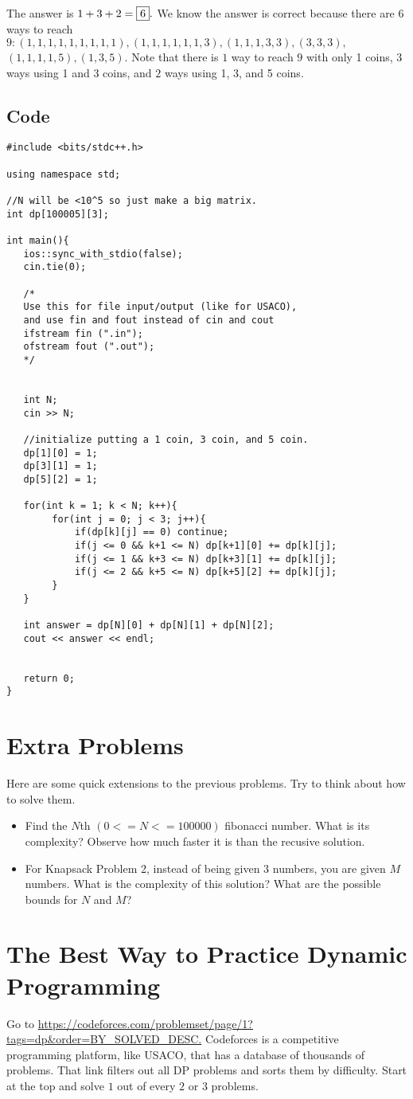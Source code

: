 \documentclass{article}
\begin{document}
The answer is $1+3+2=\fbox{6}.$ We know the answer is correct because there are $6$ ways to reach $9: (1,1,1,1,1,1,1,1,1), (1,1,1,1,1,1,3), (1,1,1,3,3), (3,3,3),$ $(1,1,1,1,5), (1,3,5).$ Note that there is $1$ way to reach $9$ with only 1 coins, $3$ ways using 1 and 3 coins, and $2$ ways using 1, 3, and 5 coins.

\subsection{Code}
\begin{lstlisting}
#include <bits/stdc++.h>

using namespace std;

//N will be <10^5 so just make a big matrix.
int dp[100005][3];

int main(){
   ios::sync_with_stdio(false);
   cin.tie(0);
   
   /*
   Use this for file input/output (like for USACO),
   and use fin and fout instead of cin and cout
   ifstream fin (".in");
   ofstream fout (".out");
   */
   
   
   int N;
   cin >> N;
   
   //initialize putting a 1 coin, 3 coin, and 5 coin.
   dp[1][0] = 1;
   dp[3][1] = 1;
   dp[5][2] = 1;
   
   for(int k = 1; k < N; k++){
        for(int j = 0; j < 3; j++){
            if(dp[k][j] == 0) continue;
            if(j <= 0 && k+1 <= N) dp[k+1][0] += dp[k][j];
            if(j <= 1 && k+3 <= N) dp[k+3][1] += dp[k][j];
            if(j <= 2 && k+5 <= N) dp[k+5][2] += dp[k][j];
        }
   }
   
   int answer = dp[N][0] + dp[N][1] + dp[N][2];
   cout << answer << endl;
   
   
   return 0;
}
\end{lstlisting}

\section{Extra Problems}
Here are some quick extensions to the previous problems. Try to think about how to solve them.

\begin{itemize}
    \item Find the $N$th $(0 <= N <= 100000)$ fibonacci number. What is its complexity? Observe how much faster it is than the recusive solution.
    \item For Knapsack Problem 2, instead of being given $3$ numbers, you are given $M$ numbers. What is the complexity of this solution? What are the possible bounds for $N$ and $M$?
\end{itemize}


\section{The Best Way to Practice Dynamic Programming}
Go to \url{https://codeforces.com/problemset/page/1?tags=dp&order=BY_SOLVED_DESC.} Codeforces is a competitive programming platform, like USACO, that has a database of thousands of problems. That link filters out all DP problems and sorts them by difficulty. Start at the top and solve $1$ out of every $2$ or $3$ problems.
\end{document}
